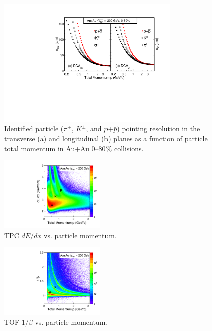 \documentclass[%
 reprint,	
 amsmath,amssymb,
 aps,
 prc,
]{revtex4-1}
\begin{document}
\begin{figure}
\centering
\includegraphics[width=0.78\textwidth]{fig/DCAXy_Z.pdf}
\caption{Identified particle ($\pi^{\pm}$, $K^{\pm}$, and $p$+$\bar{p}$) pointing resolution in the transverse (a) and longitudinal (b) planes as a function of particle total momentum in Au+Au 0--80\% collisions.}
\label{fig:DCAXy_Z} 
\end{figure}

\begin{figure}[h]
\centering
\includegraphics[width=0.45\textwidth]{fig/PID_dEdx.pdf}
\caption{TPC $dE/dx$ vs. particle momentum.}
\label{fig:PID_dEdx} 
\end{figure}

\begin{figure}[h]
\centering
\includegraphics[width=0.45\textwidth]{fig/PID_beta.pdf}
\caption{TOF $1/\beta$ vs. particle momentum.}
\label{fig:PID_beta} 
\end{figure}
\end{document}
